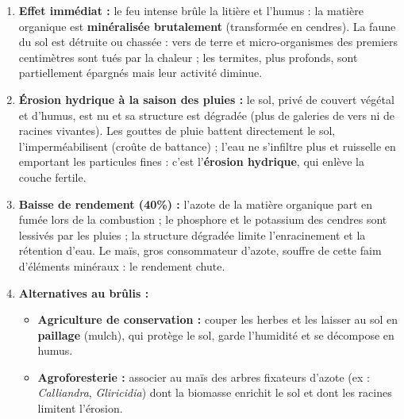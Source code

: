 \documentclass[11pt]{article}
\begin{document}
\begin{corrige}
\begin{enumerate}
    \item \textbf{Effet immédiat :} le feu intense brûle la litière et l'humus : la matière organique est \textbf{minéralisée brutalement} (transformée en cendres). La faune du sol est détruite ou chassée : vers de terre et micro-organismes des premiers centimètres sont tués par la chaleur ; les termites, plus profonds, sont partiellement épargnés mais leur activité diminue.
    \item \textbf{Érosion hydrique à la saison des pluies :} le sol, privé de couvert végétal et d'humus, est nu et sa structure est dégradée (plus de galeries de vers ni de racines vivantes). Les gouttes de pluie battent directement le sol, l'imperméabilisent (croûte de battance) ; l'eau ne s'infiltre plus et ruisselle en emportant les particules fines : c'est l'\textbf{érosion hydrique}, qui enlève la couche fertile.
    \item \textbf{Baisse de rendement (\num{40}\%) :} l'azote de la matière organique part en fumée lors de la combustion ; le phosphore et le potassium des cendres sont lessivés par les pluies ; la structure dégradée limite l'enracinement et la rétention d'eau. Le maïs, gros consommateur d'azote, souffre de cette faim d'éléments minéraux : le rendement chute.
    \item \textbf{Alternatives au brûlis :}
    \begin{itemize}
        \item \textbf{Agriculture de conservation :} couper les herbes et les laisser au sol en \textbf{paillage} (mulch), qui protège le sol, garde l'humidité et se décompose en humus.
        \item \textbf{Agroforesterie :} associer au maïs des arbres fixateurs d'azote (ex : \emph{Calliandra}, \emph{Gliricidia}) dont la biomasse enrichit le sol et dont les racines limitent l'érosion.
    \end{itemize}
\end{enumerate}
\end{corrige}
\end{document}
